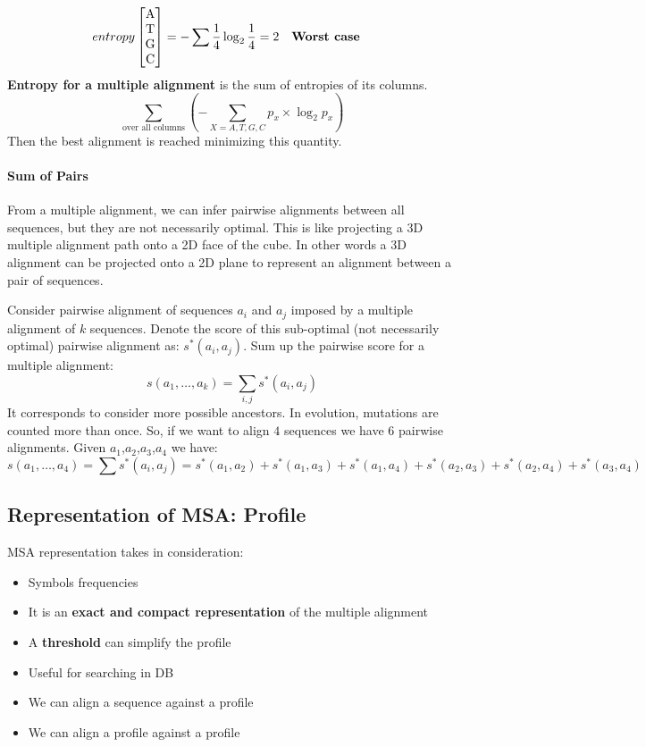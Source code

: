 \begin{align}
entropy & \begin{bmatrix}
$A$ \\
$T$ \\
$G$ \\
$C$
\end{bmatrix} = -\sum\frac{1}{4}\log_2\frac{1}{4} = 2 && \text{\textbf{Worst case}}
\end{align}
\textbf{Entropy for a multiple alignment} is the sum of entropies of its columns.
$$\sum_{\text{over all columns}}(- \sum_{X = A,T,G,C} p_x \times \log_2p_x)$$
Then the best alignment is reached minimizing this quantity.

\paragraph{Sum of Pairs} From a multiple alignment, we can infer pairwise alignments between all sequences, but they are not necessarily optimal. This is like projecting a 3D multiple alignment path onto a 2D face of the cube. In other words a 3D alignment can be projected onto a 2D plane to represent an alignment between a pair of sequences.

Consider pairwise alignment of sequences $a_i$ and $a_j$ imposed by a multiple alignment of $k$ sequences. Denote the score of this sub-optimal (not necessarily optimal) pairwise alignment as: $s^*(a_i,a_j)$. Sum up the pairwise score for a multiple alignment:
$$s(a_1,\dots,a_k) = \sum_{i,j} s^*(a_i,a_j) $$
It corresponds to consider more possible ancestors. In evolution, mutations are counted more than once. So, if we want to align $4$ sequences we have $6$ pairwise alignments.
Given $a_1$,$a_2$,$a_3$,$a_4$ we have:
$$s(a_1,\dots, a_4) = \sum s^*(a_i,a_j) = s^*(a_1,a_2)+s^*(a_1,a_3)+s^*(a_1,a_4)+s^*(a_2,a_3)+s^*(a_2,a_4)+s^*(a_3,a_4)$$

\subsection{Representation of MSA: Profile}
MSA representation takes in consideration:
\begin{itemize}
	\item Symbols frequencies
	\item It is an \textbf{exact and compact representation} of the multiple alignment
	\item A \textbf{threshold} can simplify the profile
	\item Useful for searching in DB
	\item We can align a sequence against a profile
	\item We can align a profile against a profile
\end{itemize}

